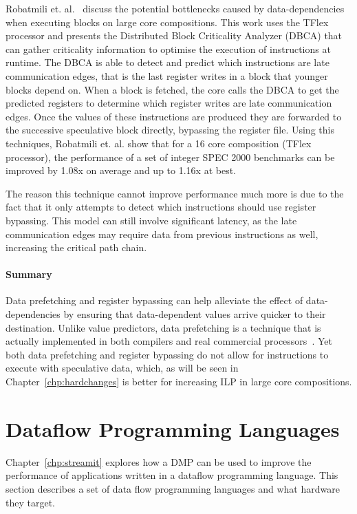 Robatmili et. al.~\cite{robatmili2011uniproc} discuss the potential bottlenecks caused by data-dependencies when executing blocks on large core compositions.
This work uses the TFlex processor and presents the Distributed Block Criticality Analyzer (DBCA) that can gather criticality information to optimise the execution of instructions at runtime.
The DBCA is able to detect and predict which instructions are late communication edges, that is the last register writes in a block that younger blocks depend on.
When a block is fetched, the core calls the DBCA to get the predicted registers to determine which register writes are late communication edges.
Once the values of these instructions are produced they are forwarded to the successive speculative block directly, bypassing the register file.
Using this techniques, Robatmili et. al. show that for a 16 core composition (TFlex processor), the performance of a set of integer SPEC 2000 benchmarks can be improved by 1.08x on average and up to 1.16x at best.

The reason this technique cannot improve performance much more is due to the fact that it only attempts to detect which instructions should use register bypassing.
This model can still involve significant latency, as the late communication edges may require data from previous instructions as well, increasing the critical path chain.

\vspace{-1em}
\paragraph*{Summary}
Data prefetching and register bypassing can help alleviate the effect of data-dependencies by ensuring that data-dependent values arrive quicker to their destination.
Unlike value predictors, data prefetching is a technique that is actually implemented in both compilers and real commercial processors~\cite{intelmanual}.
Yet both data prefetching and register bypassing do not allow for instructions to execute with speculative data, which, as will be seen in Chapter~\ref{chp:hardchanges} is better for increasing ILP in large core compositions.
\vspace{-1em}
\section{Dataflow Programming Languages}

Chapter~\ref{chp:streamit} explores how a DMP can be used to improve the performance of applications written in a dataflow programming language.
This section describes a set of data flow programming languages and what hardware they target.

